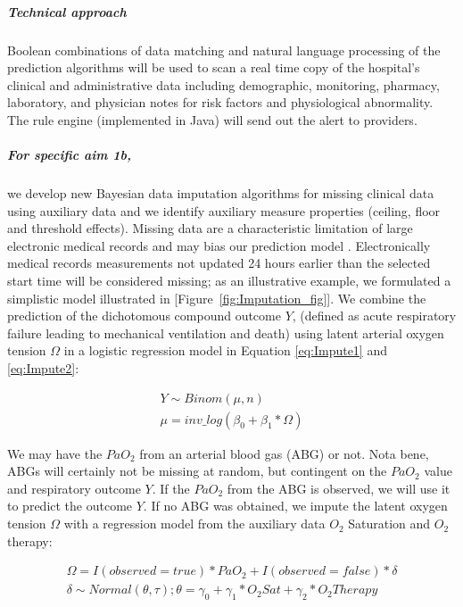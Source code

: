 \documentclass[11pt,notitlepage]{article}
\begin{document}
\subparagraph*{Technical approach}
Boolean combinations of data matching and natural language processing of the prediction algorithms will be used to scan a real time copy of the hospital's clinical and administrative data including demographic, monitoring, pharmacy, laboratory, and physician notes for risk factors and physiological abnormality. The rule engine (implemented in Java) will send out the alert to providers.

\subparagraph*{For specific aim 1b,} we develop new Bayesian data imputation algorithms for missing clinical data using auxiliary data and we identify auxiliary measure properties (ceiling, floor and threshold effects). Missing data are a characteristic limitation of large electronic medical records and may bias our prediction model \cite{Dean_19279318}. Electronically medical records measurements not updated 24 hours earlier than the selected start time will be considered missing;  as an illustrative example, we formulated a simplistic model illustrated in [Figure~\ref{fig:Imputation_fig}]. We combine the prediction of the dichotomous compound outcome $Y$, (defined as acute respiratory failure leading to mechanical ventilation and death) using latent arterial oxygen tension $\Omega$ in a logistic regression model in Equation \ref{eq:Impute1} and \ref{eq:Impute2}:
 
\begin{figure}
   \vspace{-25pt}
\begin{align} \label{eq:Impute1}
Y \sim Binom(\mu, n)\\ 
\mu = inv\_log(\beta_{0} + \beta_{1} * \Omega)\label{eq:Impute2}
\end{align}
   \vspace{-25pt}
\end{figure}

We may have the $PaO_{2}$ from an arterial blood gas (ABG) or not. Nota bene, ABGs will certainly not be missing at random, but contingent on the $PaO_2$ value and respiratory outcome $Y$. If the $PaO_{2}$ from the ABG is observed, we will use it to predict the outcome $Y$. If no ABG was obtained, we impute the latent oxygen tension $\Omega$ with a regression model from the auxiliary data  $O_{2}$ Saturation and $O_{2}$ therapy:
 
\begin{figure}
   \vspace{-25pt}
\begin{align}\label{eq:Impute3}
\Omega =  I(observed = true) * PaO_{2}   +   I(observed = false) * \delta  \\ 
\delta \sim Normal(\theta, \tau); 
\theta = \gamma_{0} + \gamma_{1}* O_{2} Sat + \gamma_{2} * O_{2} Therapy \label{eq:Impute4}
\end{align}
   \vspace{-25pt}
\end{figure}
\end{document}
